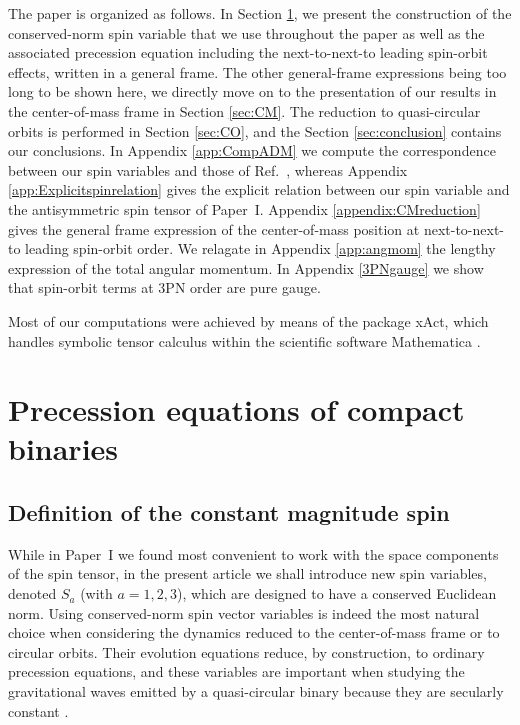 \documentclass[
superscriptaddress,
preprint,
prd,tightenlines,showpacs,nofootinbib,
eqsecnum,
amsfonts,amsmath,amssymb]{revtex4-1}
\begin{document}
The paper is organized as follows. In Section \ref{sec:spinvar}, we
present the construction of the conserved-norm spin variable that we
use throughout the paper as well as the associated precession equation
including the next-to-next-to leading spin-orbit effects, written in a
general frame. The other general-frame expressions being too long to
be shown here, we directly move on to the presentation of our results
in the center-of-mass frame in Section \ref{sec:CM}. The reduction to
quasi-circular orbits is performed in Section \ref{sec:CO}, and the
Section \ref{sec:conclusion} contains our conclusions. In Appendix
\ref{app:CompADM} we compute the correspondence between our spin
variables and those of Ref.~\cite{Hartung2011}, whereas Appendix
\ref{app:Explicitspinrelation} gives the explicit relation between our
spin variable and the antisymmetric spin tensor of Paper~I. Appendix
\ref{appendix:CMreduction} gives the general frame expression of the
center-of-mass position at next-to-next-to leading spin-orbit
order. We relagate in Appendix \ref{app:angmom} the lengthy
  expression of the total angular momentum. In Appendix \ref{3PNgauge}
  we show that spin-orbit terms at 3PN order are pure gauge.

Most of our computations were achieved by means of the package xAct,
which handles symbolic tensor calculus within the scientific software
Mathematica{\footnotesize \textregistered} \cite{xtensor}.

\section{Precession equations of compact binaries}
\label{sec:spinvar}

\subsection{Definition of the constant magnitude spin}

While in Paper~I we found most convenient to work with the space
components of the spin tensor, in the present article we shall
introduce new spin variables, denoted $S_{a}$ (with $a=1,2,3$), which
are designed to have a conserved Euclidean norm. Using conserved-norm
spin vector variables is indeed the most natural choice when
  considering the dynamics reduced to the center-of-mass frame or to
circular orbits. Their evolution equations reduce, by construction, to
ordinary precession equations, and these variables are important when
studying the gravitational waves emitted by a quasi-circular binary
because they are secularly constant \cite{Will05,Blanchet2006}.
\end{document}
